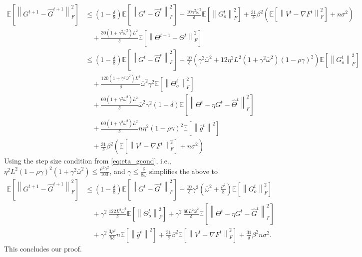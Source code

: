 \documentclass[10pt]{article} %
\theoremstyle{plain}
\theoremstyle{definition}
\theoremstyle{remark}
\newcommand{\grdF}{\nabla F}
\newcommand{\bw}{\bar{\omega}}
\newcommand{\avgg}{\bar{g}}
\newcommand{\norm}[1]{\left\| #1 \right\|}
\newcommand{\nl}{\nonumber\\}
\newcommand{\hatTheta}{\widehat{\Theta}}
\begin{document}
\begin{align*}
\mathbb{E} \left[ \norm{ G^{t+1} - \hat{G}^{t+1} }_F^2 \right] & \leq \left(1 - \frac{\delta}{8} \right) \mathbb{E} \left[ \norm{ G^{t} - \hat{G}^{t} }_F^2 \right] + \frac{10 \gamma^2 \bw^2}{\delta} \mathbb{E} \left[ \norm{G_o^t}_F^2 \right] + \frac{31}{\delta} \beta^2 \left( \mathbb{E} \left[ \norm{ V^t - \grdF^t}_F^2 \right] + n \sigma^2 \right) \nl
& \quad + \frac{30 (1+\gamma^2 \bw^2) L^2}{\delta} \mathbb{E} \left[ \norm{ \Theta^{t+1} - \Theta^t }_F^2 \right] \nl 
& \leq \left(1 - \frac{\delta}{8} \right) \mathbb{E} \left[ \norm{ G^{t} - \hat{G}^{t} }_F^2 \right] + \frac{10}{\delta} \left(  \gamma^2 \bw^2 + 12 \eta^2 L^2 (1 + \gamma^2 \bw^2) (1 - \rho \gamma)^2 \right) \mathbb{E} \left[ \norm{G_o^t}_F^2 \right] \nl 
& \quad + \frac{120 ( 1+\gamma^2\bw^2) L^2}{\delta} \bw^2\gamma^2\mathbb{E} \left[ \norm{\Theta_o^t}_F^2 \right] \nl
& \quad + \frac{60 ( 1+\gamma^2\bw^2) L^2}{\delta} \bw^2 \gamma^2 (1 - \delta) \mathbb{E} \left[ \norm{ \Theta^t - \eta G^t - \hatTheta^t }_F^2 \right] \nl
& \quad + \frac{60 ( 1+\gamma^2\bw^2) L^2}{\delta} n \eta^2 (1 - \rho\gamma)^2 \mathbb{E} \left[ \norm{ \avgg^t }^2 \right] \nl
& \quad + \frac{31}{\delta} \beta^2 \left( \mathbb{E} \left[ \norm{ V^t - \grdF^t}_F^2 \right] + n \sigma^2 \right)
\end{align*}
Using the step size condition from \eqref{eq:eta_gcond}, i.e., $\eta^2 L^2 (1-\rho \gamma)^2 (1+\gamma^2 \bw^2) \leq \frac{ \rho^2 \gamma^2 }{ 100 }$, and $\gamma\leq\frac{\delta}{8\bw}$ simplifies the above to 
\begin{align*}
\mathbb{E} \left[ \norm{ G^{t+1} - \hat{G}^{t+1} }_F^2 \right] & \leq \left(1 - \frac{\delta}{8} \right) \mathbb{E} \left[ \norm{ G^{t} - \hat{G}^{t} }_F^2 \right] + \frac{10}{\delta} \gamma^2 \left( \bw^2 + \frac{\rho^2 }{8} \right) \mathbb{E} \left[ \norm{G_o^t}_F^2 \right] \nl 
& \quad + \gamma^2 \,\frac{122L^2\bw^2}{\delta} \mathbb{E} \left[ \norm{\Theta_o^t}_F^2 \right] + \gamma^2 \, \frac{60 L^2 \bw^2}{\delta} \mathbb{E} \left[ \norm{ \Theta^t - \eta G^t - \hat{G}^t }_F^2 \right] \nl
& \quad + \gamma^2 \, \frac{3 \rho^2}{5 \delta} n \mathbb{E} \left[ \norm{ \avgg^t }^2 \right]  + \frac{31}{\delta} \beta^2 \mathbb{E} \left[ \norm{ V^t - \grdF^t }_F^2 \right] + \frac{31}{\delta} \beta^2 n \sigma^2 .
\end{align*}
This concludes our proof.
\end{document}
